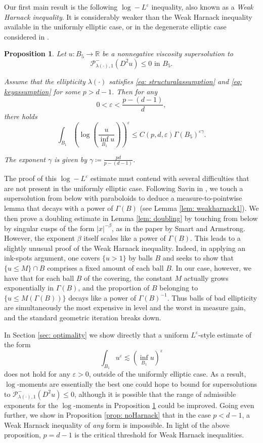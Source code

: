 \documentclass[reqno]{amsart}
\numberwithin{equation}{section}
\newtheorem{prop}[thm]{Proposition}
\numberwithin{equation}{section}
\newcommand{\R}{\mathbb R}
\newcommand{\eps}{\varepsilon}
\newcommand{\ds}{\displaystyle}
\newcounter{case}
\begin{document}
Our first main result is the following $\log-L^\eps$ inequality, also known as a \textit{Weak Harnack inequality}. It is considerably weaker than the Weak Harnack inequality available in the uniformly elliptic case, or in the degenerate elliptic case considered in \cite{ImbertSilvestre2016}. 
\begin{prop}
\label{prop: logL^eps}
Let $u: B_5 \to \R$ be a nonnegative viscosity supersolution to 
$$\mathcal{P}^-_{\lambda(\cdot),1}(D^2u) \le 0 \text{ in } B_5.$$

Assume that the ellipticity $\lambda(\cdot)$ satisfies \eqref{eq: structuralassumption} and \eqref{eq: keyassumption} for some $p>d-1$. Then for any $$0 < \eps < \ds \frac{p-(d-1)}{d},$$
there holds
$$\int_{B_1} \left(\log \left(\frac{u}{\inf_{B_1}u}\right)\right)^\eps \le C(p,d, \eps) \Gamma(B_5)^{ \eps \gamma}.$$

The exponent $\gamma$ is given by $\ds \gamma \coloneqq \frac{pd}{p-(d-1)}$.
\end{prop}
The proof of this $\log-L^\eps$ estimate must contend with several difficulties that are not present in the uniformly elliptic case. Following Savin in \cite{Savin2005}, we touch a supersolution from below with paraboloids to deduce a measure-to-pointwise lemma that decays with a power of $\Gamma(B)$ (see Lemma \ref{lem: weakharnack1}). We then prove a doubling estimate in Lemma \ref{lem: doubling} by touching from below by singular cusps of the form $|x|^{-\beta}$, as in the paper \cite{ArmstrongSmart2014} by Smart and Armstrong. However, the exponent $\beta$ itself scales like a power of $\Gamma(B)$. This leads to a slightly unusual proof of the Weak Harnack inequality. Indeed, in applying an ink-spots argument, one covers $\{u>1\}$ by balls $B$ and seeks to show that $\{u \le M\} \cap B$ comprises a fixed amount of each ball $B$. In our case, however, we have that for each ball $B$ of the covering, the constant $M$ actually grows exponentially in $\Gamma(B)$, and the proportion of $B$ belonging to $\{u\le M(\Gamma(B))\}$ decays like a power of $\Gamma(B)^{-1}$. Thus balls of bad ellipticity are simultaneously the most expensive in level and the worst in measure gain, and the standard geometric iteration breaks down. 

In Section \ref{sec: optimality} we show directly that a uniform $L^\eps$-style estimate of the form $$\int_{B_1} u^\eps \lesssim (\inf_{B_1} u)^\eps$$
does not hold for any $\eps>0$, outside of the uniformly elliptic case. As a result, $\log$-moments are essentially the best one could hope to bound for supersolutions to $\mathcal{P}^-_{\lambda(\cdot),1}(D^2u)\le 0$, although it is possible that the range of admissible exponents for the $\log$-moments in Proposition \ref{prop: logL^eps} could be improved. Going even further, we show in Proposition \ref{prop: noHarnack} that in the case $p<d-1$, a Weak Harnack inequality of \textit{any} form is impossible. In light of the above proposition, $p=d-1$ is the critical threshold for Weak Harnack inequalities. 
\end{document}
